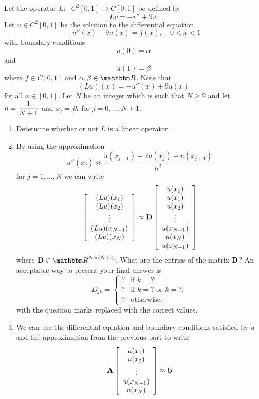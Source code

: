 
Let the operator $L:\mbox{ }C^2[0,1]\rightarrow C[0,1]$ be defined by 
\[
Lv=-v''+9v.
\]
Let $u\in C^2[0,1]$ be the solution to the differential equation
\[
-u''(x)+9u(x)=f(x),\quad0<x<1
\]
with boundary conditions
\[
u(0)=\alpha
\]
and
\[
u(1)=\beta
\]
where $f\in C[0,1]$ and $\alpha,\beta\in\R$. Note that
\[
(Lu)(x)=-u''(x)+9u(x)
\]
for all $x\in[0,1]$. Let $N$ be an integer which is such that $N\ge2$ and let $\displaystyle{h = {1\over N+1}}$ and $x_j = jh$ for $j=0,\ldots, N+1$.

\begin{enumerate}
\item Determine whether or not $L$ is a linear operator.
\\
\item By using the approximation
\[
u''(x_j)\approx\frac{u(x_{j-1})-2u(x_j)+u(x_{j+1})}{h^2}
\]
for $j=1,\ldots,N$ we can write
\[
\left[\begin{array}{c} (Lu)(x_1) \\ (Lu)(x_2) \\ \vdots \\ (Lu)(x_{N-1}) \\ (Lu)(x_N) \end{array}\right]\approx{\bf D}\left[\begin{array}{c} u(x_0) \\ u(x_1) \\u(x_2) \\ \vdots \\ u(x_{N-1}) \\ u(x_N) \\ u(x_{N+1}) \end{array}\right]
\]
where $\BD\in\R^{N\times\left(N+2\right)}$. What are the entries of the matrix ${\bf D}$? An acceptable way to present your final answer is
\[
D_{jk}=\left\{\begin{array}{rl}
? & \mbox{if }k=?;
\\
? & \mbox{if }k=?\mbox{ or }k=?;
\\
? & \mbox{otherwise};
\end{array}\right.
\]
with the question marks replaced with the correct values.
\\
\item We can use the differential equation and boundary conditions satisfied by $u$ and the approximation from the previous part to write
\[
{\bf A}\left[\begin{array}{c} u(x_1) \\u(x_2) \\ \vdots \\ u(x_{N-1}) \\ u(x_N) \end{array}\right]\approx{\bf b}
\]
\end{enumerate}

